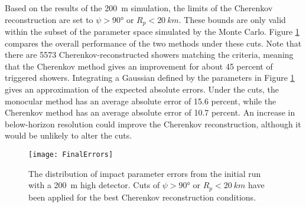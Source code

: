 Based on the results of the \SI{200}{m} simulation, the limits of the Cherenkov reconstruction are set to $\psi > \ang{90}$ or $R_p < \SI{20}{km}$. These bounds are only valid within the subset of the parameter space simulated by the Monte Carlo. Figure \ref{fig:cutoff_hist} compares the overall performance of the two methods under these cuts. Note that there are \num{5573} Cherenkov-reconstructed showers matching the criteria, meaning that the Cherenkov method gives an improvement for about 45 percent of triggered showers. Integrating a Gaussian defined by the parameters in Figure \ref{fig:cutoff_hist} gives an approximation of the expected absolute errors. Under the cuts, the monocular method has an average absolute error of 15.6 percent, while the Cherenkov method has an average absolute error of 10.7 percent. An increase in below-horizon resolution could improve the Cherenkov reconstruction, although it would be unlikely to alter the cuts.

\begin{figure}[p]
    \label{fig:cutoff_hist}
    \centering
    \texttt{[image: FinalErrors]}
    \caption{The distribution of impact parameter errors from the initial run with a \SI{200}{m} high detector. Cuts of $\psi > \ang{90}$ or $R_p < \SI{20}{km}$ have been applied for the best Cherenkov reconstruction conditions.}
\end{figure}